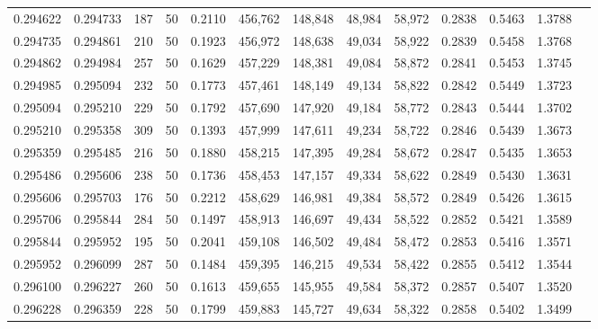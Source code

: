 \begin{tabular}{rrrrrrrrrrrrr}
0.294622 & 0.294733 &   187 &  50 &                                     0.2110 & 456,762 & 148,848 &  48,984 &  58,972 & 0.2838 & 0.5463 & 1.3788 \\
0.294735 & 0.294861 &   210 &  50 &                                     0.1923 & 456,972 & 148,638 &  49,034 &  58,922 & 0.2839 & 0.5458 & 1.3768 \\
0.294862 & 0.294984 &   257 &  50 &                                     0.1629 & 457,229 & 148,381 &  49,084 &  58,872 & 0.2841 & 0.5453 & 1.3745 \\
0.294985 & 0.295094 &   232 &  50 &                                     0.1773 & 457,461 & 148,149 &  49,134 &  58,822 & 0.2842 & 0.5449 & 1.3723 \\
0.295094 & 0.295210 &   229 &  50 &                                     0.1792 & 457,690 & 147,920 &  49,184 &  58,772 & 0.2843 & 0.5444 & 1.3702 \\
0.295210 & 0.295358 &   309 &  50 &                                     0.1393 & 457,999 & 147,611 &  49,234 &  58,722 & 0.2846 & 0.5439 & 1.3673 \\
0.295359 & 0.295485 &   216 &  50 &                                     0.1880 & 458,215 & 147,395 &  49,284 &  58,672 & 0.2847 & 0.5435 & 1.3653 \\
0.295486 & 0.295606 &   238 &  50 &                                     0.1736 & 458,453 & 147,157 &  49,334 &  58,622 & 0.2849 & 0.5430 & 1.3631 \\
0.295606 & 0.295703 &   176 &  50 &                                     0.2212 & 458,629 & 146,981 &  49,384 &  58,572 & 0.2849 & 0.5426 & 1.3615 \\
0.295706 & 0.295844 &   284 &  50 &                                     0.1497 & 458,913 & 146,697 &  49,434 &  58,522 & 0.2852 & 0.5421 & 1.3589 \\
0.295844 & 0.295952 &   195 &  50 &                                     0.2041 & 459,108 & 146,502 &  49,484 &  58,472 & 0.2853 & 0.5416 & 1.3571 \\
0.295952 & 0.296099 &   287 &  50 &                                     0.1484 & 459,395 & 146,215 &  49,534 &  58,422 & 0.2855 & 0.5412 & 1.3544 \\
0.296100 & 0.296227 &   260 &  50 &                                     0.1613 & 459,655 & 145,955 &  49,584 &  58,372 & 0.2857 & 0.5407 & 1.3520 \\
0.296228 & 0.296359 &   228 &  50 &                                     0.1799 & 459,883 & 145,727 &  49,634 &  58,322 & 0.2858 & 0.5402 & 1.3499 \\

\end{tabular}
